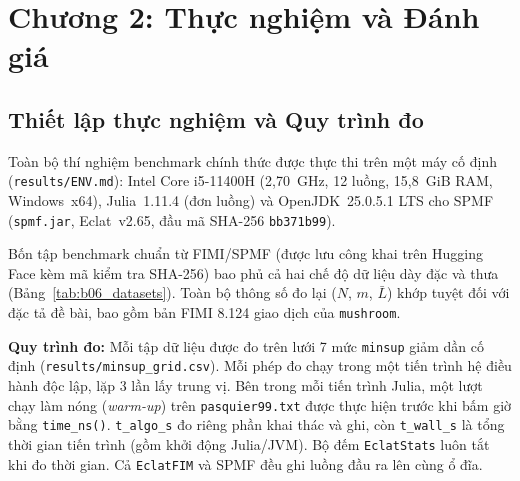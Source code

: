 \section{Chương 2: Thực nghiệm và Đánh giá}
\label{sec:04_chapter2_experiments}

\subsection{Thiết lập thực nghiệm và Quy trình đo}
\label{subsec:exp_setup}

Toàn bộ thí nghiệm benchmark chính thức được thực thi trên một máy cố định (\texttt{results/ENV.md}): Intel Core i5-11400H (2{,}70~GHz, 12 luồng, 15{,}8~GiB RAM, Windows~x64), Julia~1.11.4 (đơn luồng) và OpenJDK~25.0.5.1 LTS cho SPMF (\texttt{spmf.jar}, Eclat~v2.65, đầu mã SHA-256 \texttt{bb371b99}).

Bốn tập benchmark chuẩn từ FIMI/SPMF (được lưu công khai trên Hugging Face kèm mã kiểm tra SHA-256) bao phủ cả hai chế độ dữ liệu dày đặc và thưa (Bảng~\ref{tab:b06_datasets}). Toàn bộ thông số đo lại ($N$, $m$, $\bar{L}$) khớp tuyệt đối với đặc tả đề bài, bao gồm bản FIMI 8.124 giao dịch của \texttt{mushroom}.

\begin{table}[!t]
\centering
\caption{Bốn tập dữ liệu benchmark sử dụng trong Chương~2 (Bảng~B06).}
\label{tab:b06_datasets}
\scriptsize
{}
\end{table}

\textbf{Quy trình đo:} Mỗi tập dữ liệu được đo trên lưới 7 mức \texttt{minsup} giảm dần cố định (\texttt{results/minsup\_grid.csv}). Mỗi phép đo chạy trong một tiến trình hệ điều hành độc lập, lặp 3 lần lấy trung vị. Bên trong mỗi tiến trình Julia, một lượt chạy làm nóng (\emph{warm-up}) trên \texttt{pasquier99.txt} được thực hiện trước khi bấm giờ bằng \texttt{time\_ns()}. \texttt{t\_algo\_s} đo riêng phần khai thác và ghi, còn \texttt{t\_wall\_s} là tổng thời gian tiến trình (gồm khởi động Julia/JVM). Bộ đếm \texttt{EclatStats} luôn tắt khi đo thời gian. Cả \texttt{EclatFIM} và SPMF đều ghi luồng đầu ra lên cùng ổ đĩa.

